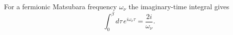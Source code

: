 \documentclass{article}
\begin{document}
For a fermionic Matsubara frequency $\omega_\nu$ the imaginary-time integral gives
\begin{equation}
\int_0^{\beta} d\tau\, e^{i\omega_\nu\tau} = \frac{2i}{\omega_\nu} .
\label{eq:f}
\end{equation}
\end{document}
